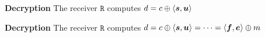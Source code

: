 \begin{frame}
\begin{overprint}
 \begin{block}{\textbf{Decryption}}
 The receiver $\mathtt{R}$ computes $d = c \mathbin{\oplus} \langle \boldsymbol{s},\boldsymbol{u} \rangle$ 
\end{block}

 \begin{block}{\textbf{Decryption}}
 The receiver $\mathtt{R}$ computes $d = c \mathbin{\oplus} \langle \boldsymbol{s},\boldsymbol{u} \rangle = 
 \dots = \langle  \boldsymbol{f} , \boldsymbol{e} \rangle \mathbin{\oplus} m$ \\ 
\end{block}

\end{overprint}

\end{frame}

